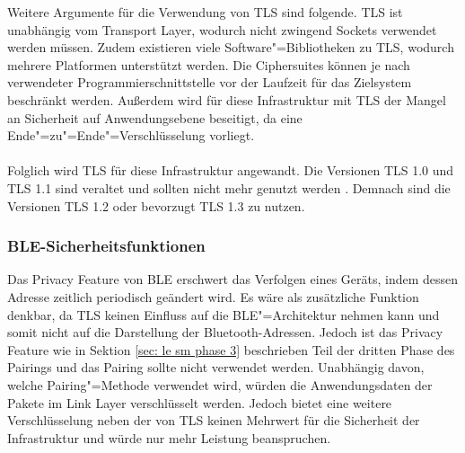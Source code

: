 Weitere Argumente für die Verwendung von TLS sind folgende. TLS ist unabhängig vom Transport Layer, wodurch nicht zwingend Sockets verwendet werden müssen. Zudem existieren viele Software"=Bibliotheken zu TLS, wodurch mehrere Platformen unterstützt werden. Die Ciphersuites können je nach verwendeter Programmierschnittstelle vor der Laufzeit für das Zielsystem beschränkt werden. Außerdem wird für diese Infrastruktur mit TLS der Mangel an Sicherheit auf Anwendungsebene beseitigt, da eine Ende"=zu"=Ende"=Verschlüsselung vorliegt. %
\\\\
Folglich wird TLS für diese Infrastruktur angewandt. Die Versionen TLS 1.0 und TLS 1.1 sind veraltet und sollten nicht mehr genutzt werden \cite{RFC8996}. Demnach sind die Versionen TLS 1.2 oder bevorzugt TLS 1.3 zu nutzen.

\subsubsection{BLE-Sicherheitsfunktionen}
\label{sec: infra sicherheit ble funktionen}
Das Privacy Feature von BLE erschwert das Verfolgen eines Geräts, indem dessen Adresse zeitlich periodisch geändert wird. Es wäre als zusätzliche Funktion denkbar, da TLS keinen Einfluss auf die BLE"=Architektur nehmen kann und somit nicht auf die Darstellung der Bluetooth-Adressen. Jedoch ist das Privacy Feature wie in Sektion \ref{sec: le sm phase 3} beschrieben Teil der dritten Phase des Pairings und das Pairing sollte nicht verwendet werden. Unabhängig davon, welche Pairing"=Methode verwendet wird, würden die Anwendungsdaten der Pakete im Link Layer verschlüsselt werden. Jedoch bietet eine weitere Verschlüsselung neben der von TLS keinen Mehrwert für die Sicherheit der Infrastruktur und würde nur mehr Leistung beanspruchen.